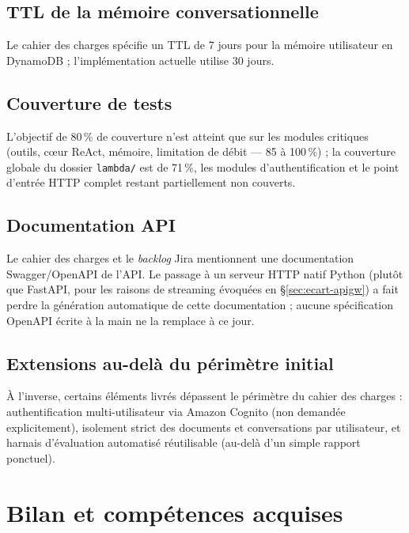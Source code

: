 \documentclass[11pt,a4paper]{report}
\begin{document}
\section{TTL de la mémoire conversationnelle}

Le cahier des charges spécifie un TTL de 7 jours pour la mémoire
utilisateur en DynamoDB ; l'implémentation actuelle utilise 30 jours.

\section{Couverture de tests}

L'objectif de 80\,\% de couverture n'est atteint que sur les modules
critiques (outils, cœur ReAct, mémoire, limitation de débit — 85 à
100\,\%) ; la couverture globale du dossier \texttt{lambda/} est de
71\,\%, les modules d'authentification et le point d'entrée HTTP
complet restant partiellement non couverts.

\section{Documentation API}

Le cahier des charges et le \textit{backlog} Jira mentionnent une
documentation Swagger/OpenAPI de l'API. Le passage à un serveur HTTP
natif Python (plutôt que FastAPI, pour les raisons de streaming
évoquées en \S\ref{sec:ecart-apigw}) a fait perdre la génération
automatique de cette documentation ; aucune spécification OpenAPI
écrite à la main ne la remplace à ce jour.

\section{Extensions au-delà du périmètre initial}

À l'inverse, certains éléments livrés dépassent le périmètre du cahier
des charges : authentification multi-utilisateur via Amazon Cognito
(non demandée explicitement), isolement strict des documents et
conversations par utilisateur, et harnais d'évaluation automatisé
réutilisable (au-delà d'un simple rapport ponctuel).

\chapter{Bilan et compétences acquises}
\end{document}
